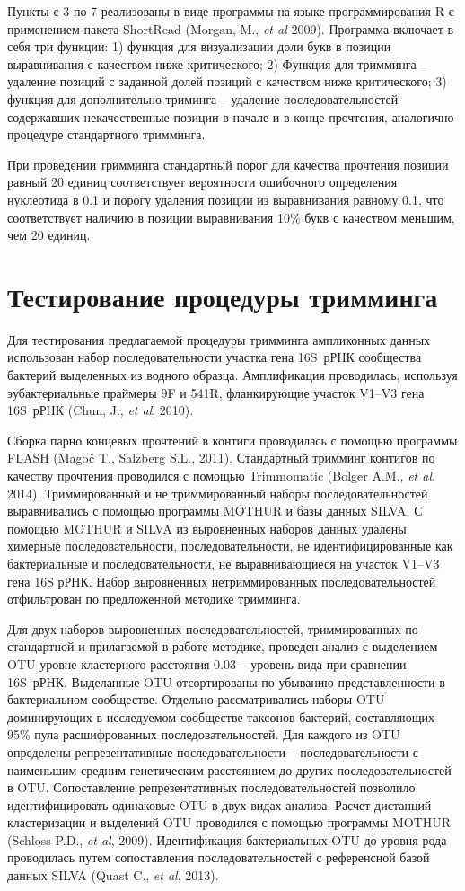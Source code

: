 \documentclass[a4paper,12pt,openany,final]{extreport}
\newcommand*{\hl}[1]{%
\tikz[baseline]\node[rectangle, fill=yellow, rounded corners, inner sep=0.3mm,anchor=base]{#1};%
}
\providecommand\hl[1]{}
\renewcommand\hl[1]{#1}
\begin{document}
Пункты с 3 по 7 реализованы в виде программы на языке программирования R с применением пакета ShortRead (Morgan, M., \textit{et al} 2009). Программа включает в себя три функции: 1) функция для визуализации доли букв в позиции выравнивания с качеством ниже критического; 2) Функция для тримминга -- удаление позиций с заданной долей позиций с качеством ниже критического; 3) функция для дополнительно триминга -- удаление последовательностей содержавших некачественные позиции в начале и в конце прочтения, аналогично процедуре стандартного тримминга.

При проведении тримминга стандартный порог для качества прочтения позиции равный 20 единиц соответствует вероятности ошибочного определения нуклеотида в 0.1 и порогу удаления позиции из выравнивания равному 0.1, что соответствует наличию в позиции выравнивания 10\% букв с качеством меньшим, чем 20 единиц.

\section{Тестирование процедуры тримминга}

Для тестирования предлагаемой процедуры тримминга ампликонных данных использован набор последовательности участка гена 16S~рРНК сообщества бактерий выделенных из водного образца. Амплификация проводилась, используя эубактериальные праймеры 9F и 541R, фланкирующие участок V1--V3 гена 16S~рРНК (Chun, J., \textit{et al}, 2010).

Сборка парно концевых прочтений в контиги проводилась с помощью программы FLASH (Magoč T., Salzberg S.L., 2011). Стандартный тримминг контигов по качеству прочтения проводился с помощью Trimmomatic (Bolger A.M., \textit{et al}. 2014). Триммированный и не триммированный наборы последовательностей выравнивались с помощью программы MOTHUR и базы данных SILVA. С помощью MOTHUR и SILVA из выровненных наборов данных удалены химерные последовательности, последовательности, не идентифицированные как бактериальные и последовательности, не выравнивающиеся на участок V1--V3 гена 16S рРНК. Набор выровненных нетриммированных последовательностей отфильтрован по предложенной методике тримминга.

Для двух наборов выровненных последовательностей, триммированных по стандартной и прилагаемой в работе методике, проведен анализ с выделением OTU уровне кластерного расстояния 0.03 -- уровень вида при сравнении 16S~рРНК. Выделанные OTU отсортированы по убыванию представленности в бактериальном сообществе. Отдельно рассматривались наборы OTU доминирующих в исследуемом сообществе таксонов бактерий, составляющих 95\% пула расшифрованных последовательностей. Для каждого из OTU определены репрезентативные последовательности -- последовательности с наименьшим средним генетическим расстоянием до других последовательностей в OTU. Сопоставление репрезентативных последовательностей позволило идентифицировать одинаковые OTU в двух видах анализа. Расчет \hl{дистанций кластеризации} и выделений OTU проводился с помощью программы MOTHUR (Schloss P.D., \textit{et al}, 2009). Идентификация бактериальных OTU до уровня рода проводилась путем сопоставления последовательностей с референсной базой данных SILVA (Quast C., \textit{et al}, 2013).
\end{document}
